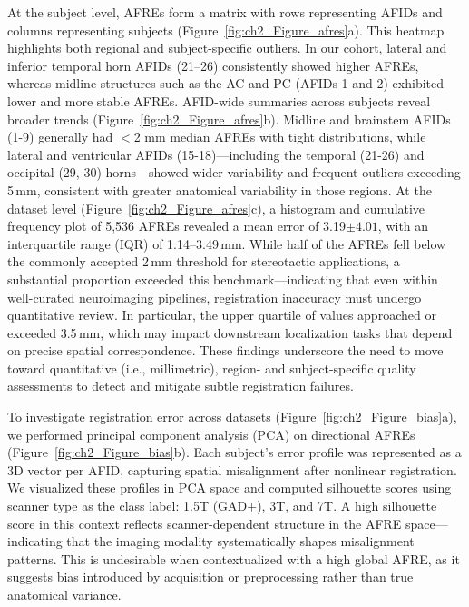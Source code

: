 At the subject level, AFREs form a matrix with rows representing AFIDs and columns representing subjects (Figure~\ref{fig:ch2_Figure_afres}a). This heatmap highlights both regional and subject-specific outliers. In our cohort, lateral and inferior temporal horn AFIDs (21–26) consistently showed higher AFREs, whereas midline structures such as the AC and PC (AFIDs 1 and 2) exhibited lower and more stable AFREs. AFID-wide summaries across subjects reveal broader trends (Figure~\ref{fig:ch2_Figure_afres}b). Midline and brainstem AFIDs (1-9) generally had \(<\)2 mm median AFREs with tight distributions, while lateral and ventricular AFIDs (15-18)—including the temporal (21-26) and occipital (29, 30) horns—showed wider variability and frequent outliers exceeding 5\,mm, consistent with greater anatomical variability in those regions. At the dataset level (Figure~\ref{fig:ch2_Figure_afres}c), a histogram and cumulative frequency plot of 5,536 AFREs revealed a mean error of 3.19\(\pm4.01\), with an interquartile range (IQR) of 1.14–3.49\,mm. While half of the AFREs fell below the commonly accepted 2\,mm threshold for stereotactic applications, a substantial proportion exceeded this benchmark—indicating that even within well-curated neuroimaging pipelines, registration inaccuracy must undergo quantitative review. In particular, the upper quartile of values approached or exceeded 3.5\,mm, which may impact downstream localization tasks that depend on precise spatial correspondence. These findings underscore the need to move toward quantitative (i.e., millimetric), region- and subject-specific quality assessments to detect and mitigate subtle registration failures. 

To investigate registration error across datasets (Figure~\ref{fig:ch2_Figure_bias}a), we performed principal component analysis (PCA) on directional AFREs (Figure~\ref{fig:ch2_Figure_bias}b). Each subject’s error profile was represented as a 3D vector per AFID, capturing spatial misalignment after nonlinear registration. We visualized these profiles in PCA space and computed silhouette scores using scanner type as the class label: 1.5T (GAD+), 3T, and 7T. A high silhouette score in this context reflects scanner-dependent structure in the AFRE space—indicating that the imaging modality systematically shapes misalignment patterns. This is undesirable when contextualized with a high global AFRE, as it suggests bias introduced by acquisition or preprocessing rather than true anatomical variance.

